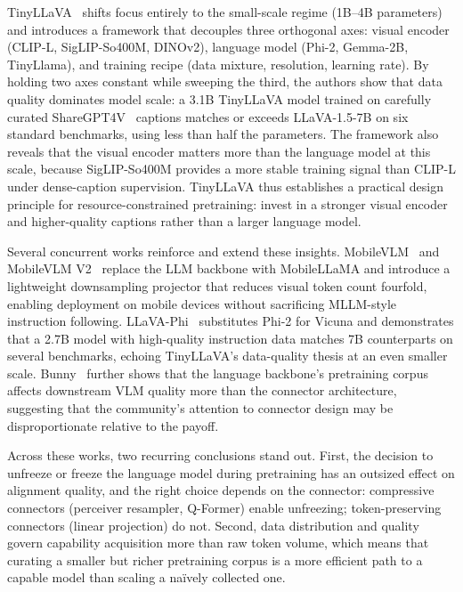 TinyLLaVA~\cite{Zhou202402289} shifts focus entirely to the small-scale regime (1B--4B parameters) and introduces a framework that decouples three orthogonal axes: visual encoder (CLIP-L, SigLIP-So400M, DINOv2), language model (Phi-2, Gemma-2B, TinyLlama), and training recipe (data mixture, resolution, learning rate). By holding two axes constant while sweeping the third, the authors show that data quality dominates model scale: a 3.1B TinyLLaVA model trained on carefully curated ShareGPT4V~\cite{Chen202311972} captions matches or exceeds LLaVA-1.5-7B on six standard benchmarks, using less than half the parameters. The framework also reveals that the visual encoder matters more than the language model at this scale, because SigLIP-So400M provides a more stable training signal than CLIP-L under dense-caption supervision. TinyLLaVA thus establishes a practical design principle for resource-constrained pretraining: invest in a stronger visual encoder and higher-quality captions rather than a larger language model.

Several concurrent works reinforce and extend these insights. MobileVLM~\cite{Chu202312539} and MobileVLM V2~\cite{Chu202401130} replace the LLM backbone with MobileLLaMA and introduce a lightweight downsampling projector that reduces visual token count fourfold, enabling deployment on mobile devices without sacrificing MLLM-style instruction following. LLaVA-Phi~\cite{Zhu202401101} substitutes Phi-2 for Vicuna and demonstrates that a 2.7B model with high-quality instruction data matches 7B counterparts on several benchmarks, echoing TinyLLaVA's data-quality thesis at an even smaller scale. Bunny~\cite{He202402116} further shows that the language backbone's pretraining corpus affects downstream VLM quality more than the connector architecture, suggesting that the community's attention to connector design may be disproportionate relative to the payoff.

Across these works, two recurring conclusions stand out. First, the decision to unfreeze or freeze the language model during pretraining has an outsized effect on alignment quality, and the right choice depends on the connector: compressive connectors (perceiver resampler, Q-Former) enable unfreezing; token-preserving connectors (linear projection) do not. Second, data distribution and quality govern capability acquisition more than raw token volume, which means that curating a smaller but richer pretraining corpus is a more efficient path to a capable model than scaling a na\"ively collected one.

